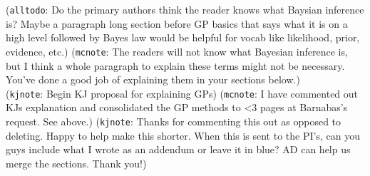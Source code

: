 \documentclass[journal=jacsat,manuscript=article]{achemso}
\newcommand{\kjnote}[1]{{\color{Blue} (\texttt{kjnote}: #1)}}
\newcommand{\alltodo}[1]{{\color{Cyan} (\texttt{alltodo}: #1)}}
\newcommand{\reals}{\ensuremath{\mathbb{R}}}
\newcommand{\xvec}{\ensuremath{\mathbf{x}}}
\newcommand{\mcnote}[1]{{\color{Plum} (\texttt{mcnote}: #1)}}
\begin{document}
\alltodo{Do the primary authors think the reader knows what Baysian inference is? Maybe a paragraph long section before GP basics that says what it is on a high level followed by Bayes law would be helpful for vocab like likelihood, prior, evidence, etc.}
\mcnote{The readers will not know what Bayesian inference is, but I think a whole paragraph to explain these terms might not be necessary. You've done a good job of explaining them in your sections below.}
\\
\kjnote{Begin KJ proposal for explaining GPs}
\mcnote{I have commented out KJs explanation and consolidated the GP methods to <3 pages at Barnabas's request. See above.}
\kjnote{Thanks for commenting this out as opposed to deleting. Happy to help make this shorter. When this is sent to the PI's, can you guys include what I wrote as an addendum or leave it in blue? AD can help us merge the sections. Thank you!}
\end{document}
